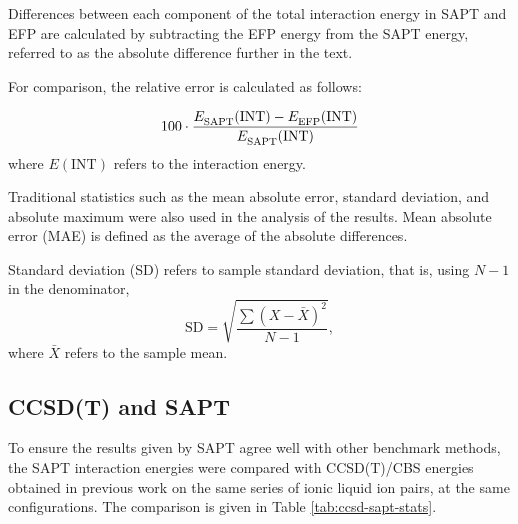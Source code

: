 

Differences between each component of the total interaction energy in SAPT and EFP are calculated by subtracting the EFP energy from the SAPT energy, referred to as the absolute difference further in the text.


For comparison, the relative error is calculated as follows: 

\begin{equation}
    100 \cdot \frac{  E^{\text{}}_{\text{SAPT}} (\text{INT}) -  E^{\text{}}_{\text{EFP}} (\text{INT}) } {  E^{\text{}}_{\text{SAPT}} (\text{INT})} 
\end{equation}
where $E(\text{INT})$ refers to the interaction energy.

Traditional statistics such as the mean absolute error, standard deviation, and absolute maximum were also used in the analysis of the results. 
Mean absolute error (MAE) is defined as the average of the absolute differences.


Standard deviation (SD) refers to sample standard deviation, that is, using $N-1$ in the denominator,
\begin{equation}
    \text{SD} = \sqrt{\frac{\sum (X - \bar{X})^2}{N-1}} ,
\end{equation}
where $\bar{X} $ refers to the sample mean.



\subsection{CCSD(T) and SAPT}
\label{subsec:ccsd}
To ensure the results given by SAPT agree well with other benchmark methods, the SAPT interaction energies were compared with CCSD(T)/CBS energies obtained in previous work 
\cite{Rigby2014a}
on the same series of ionic liquid ion pairs, at the same configurations. The comparison is given in Table \ref{tab:ccsd-sapt-stats}.


